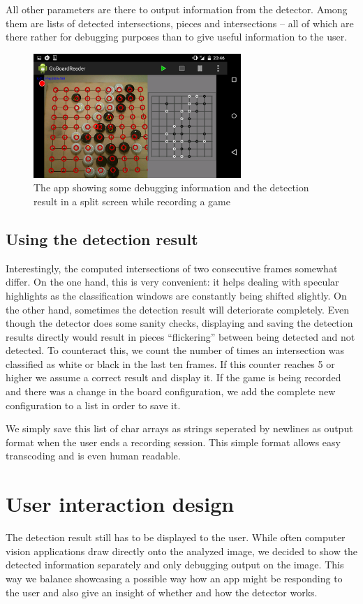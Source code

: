 	All other parameters are there to output information from the detector. Among them are lists of detected intersections, pieces and intersections -- all of which are there rather for debugging purposes than to give useful information to the user.

	\begin{figure}[t!]
		\center
		\includegraphics[width=0.7\textwidth]{images/android_ui.png}
		\caption{The app showing some debugging information and the detection result in a split screen while recording a game}
		\label{fig:android_ui}
	\end{figure}

	\subsection{Using the detection result}
	\label{android-detector-usingResults}
	Interestingly, the computed intersections of two consecutive frames somewhat differ. On the one hand, this is very convenient: it helps dealing with specular highlights as the classification windows are constantly being shifted slightly. On the other hand, sometimes the detection result will deteriorate completely. Even though the detector does some sanity checks, displaying and saving the detection results directly would result in pieces ``flickering'' between being detected and not detected. To counteract this, we count the number of times an intersection was classified as white or black in the last ten frames. If this counter reaches 5 or higher we assume a correct result and display it. If the game is being recorded and there was a change in the board configuration, we add the complete new configuration to a list in order to save it.

	We simply save this list of char arrays as strings seperated by newlines as output format when the user ends a recording session. This simple format allows easy transcoding and is even human readable.

	\section{User interaction design}
	\label{android-ui}
	The detection result still has to be displayed to the user. While often computer vision applications draw directly onto the analyzed image, we decided to show the detected information separately and only debugging output on the image. This way we balance showcasing a possible way how an app might be responding to the user and also give an insight of whether and how the detector works.

